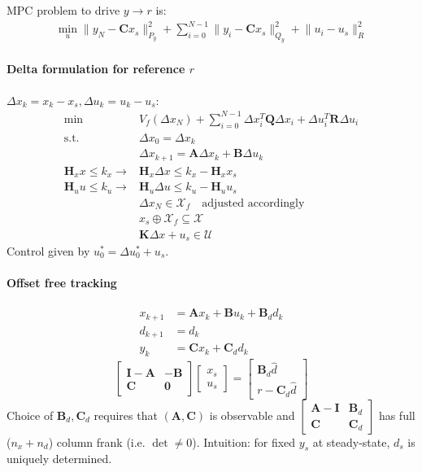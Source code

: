 \documentclass[landscape,a4paper,8pt]{scrartcl}
\newcommand{\mc}[1]{\mathcal{#1}}
\newcommand\vA{\bm{A}}
\newcommand\vB{\bm{B}}
\newcommand\vC{\bm{C}}
\newcommand\vH{\bm{H}}
\newcommand\vI{\bm{I}}
\newcommand\vK{\bm{K}}
\newcommand\vQ{\bm{Q}}
\newcommand\vR{\bm{R}}
\newcommand{\Me}[1]{\begin{bmatrix}#1\end{bmatrix}} %
\begin{document}
\begin{multicols*}{3}

MPC problem to drive $y \rightarrow r$ is:
\begin{align*}
\min_u \lVert y_N - \vC x_s \rVert_{P_y}^2 + \sum_{i=0}^{N-1}\lVert y_i - \vC x_s \rVert_{Q_y}^2 + \lVert u_i - u_s \rVert_R^2
\end{align*}

\paragraph{Delta formulation for reference $r$}
$\Delta x_k = x_k - x_s, \Delta u_k = u_k - u_s$:
\begin{align*}
\min & V_f(\Delta x_N) + \sum_{i=0}^{N-1} \Delta x_i^T\vQ\Delta x_i + \Delta u_i^T \vR \Delta u_i \\
\text{s.t. } & \Delta x_0 = \Delta x_k \\
             & \Delta x_{k+1} = \vA\Delta x_k + \vB \Delta u_k \\ %
\vH_x x \leq k_x \rightarrow & \vH_x\Delta x \leq k_x - \vH_x x_s \\
\vH_u u \leq k_u \rightarrow & \vH_u\Delta u \leq k_u - \vH_u u_s \\
                 & \Delta x_N \in \mc X_f \quad \text{adjusted accordingly} \\
								 & x_s \oplus \mc X_f \subseteq \mc X \\
								 & \vK\Delta x + u_s \in \mc U
\end{align*}
Control given by $u_0^* = \Delta u_0^* + u_s$.

\paragraph{Offset free tracking}
\begin{align*}
x_{k+1} &= \vA x_k + \vB u_k + \vB_d d_k \\
d_{k+1} &= d_k \\
y_k     &= \vC x_k + \vC_d d_k 
\end{align*}
\[
\Me{\vI-\vA & -\vB \\ \vC & \bm 0}\Me{x_s \\ u_s} = \Me{\vB_d \hat d \\ r - \vC_d \hat d}
\]
Choice of $\vB_d, \vC_d$ requires that $(\vA,\vC)$ is observable and $\Me{\vA-\vI & \vB_d \\ \vC & \vC_d}$ has full ($n_x + n_d$) column frank (i.e. $\det{} \neq 0$).
Intuition: for fixed $y_s$ at steady-state, $d_s$ is uniquely determined.


\end{multicols*}
\end{document}
